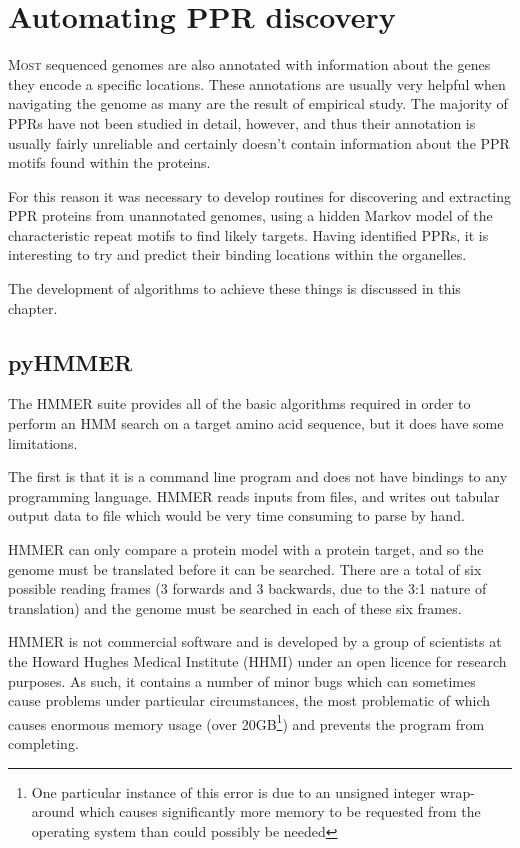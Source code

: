 
\chapter{Automating PPR discovery} 
\label{chap:methods}

\lettrine{M}{ost} 
sequenced genomes are also annotated with information about the genes they
encode a specific locations.
These annotations are usually very helpful when navigating the genome as many
are the result of empirical study.
The majority of PPRs have not been studied in detail, however, and thus their
annotation is usually fairly unreliable and certainly doesn't contain
information about the PPR motifs found within the proteins.

For this reason it was necessary to develop routines for discovering and
extracting PPR proteins from unannotated genomes, using a hidden Markov model
of the characteristic repeat motifs to find likely targets.
Having identified PPRs, it is interesting to try and predict their binding
locations within the organelles.

The development of algorithms to achieve these things is discussed in this
chapter.

\section{pyHMMER}
\label{ssec:pyHMMER}

The HMMER suite provides all of the basic algorithms required in order to
perform an HMM search on a target amino acid sequence, but it does have some
limitations.

The first is that it is a command line program and does not have bindings to
any programming language.
HMMER reads inputs from files, and writes out tabular output data to file which
would be very time consuming to parse by hand.

HMMER can only compare a protein model with a protein
target, and so the genome must be translated before it can be searched.
There are a total of six possible reading frames (3 forwards and 3 backwards, 
due to the 3:1 nature of translation) and the genome must be searched in each
of these six frames.

HMMER is not commercial software and is developed by a group of scientists at
the Howard Hughes Medical Institute (HHMI) under an open licence for research
purposes.
As such, it contains a number of minor bugs which can sometimes cause problems
under particular circumstances, the most problematic of which causes enormous
memory usage (over 20GB\footnote{One particular instance of this error is due
to an unsigned integer wrap-around which causes significantly more memory to be
requested from the operating system than could possibly be needed}) and
prevents the program from completing.

